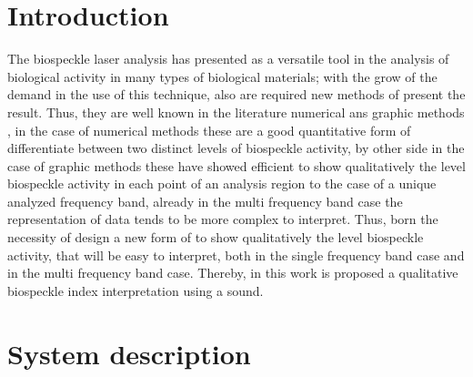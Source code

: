 \documentclass[review]{elsarticle}
\begin{document}
\section{Introduction}
The biospeckle laser analysis has presented as a versatile tool in the analysis of
biological activity in many types of biological materials; with the grow of the demand in 
the use of this technique, also are required new methods of present the result. Thus, they
are well known in the literature numerical ans graphic methods \cite{avd,Nothdurft:05},
in the case of numerical methods these are a good quantitative form of 
differentiate between two distinct levels of biospeckle activity, by other side in the case
of graphic methods these have showed efficient to show qualitatively the level biospeckle activity 
in each point of an analysis region to the case of a unique analyzed frequency band,
already in the multi frequency band case the representation of data 
tends to be more complex to interpret. 
Thus, born the necessity of design a new form of to show qualitatively the level biospeckle 
activity, that will be easy to interpret, both in the single frequency band case and in 
the multi frequency band case. Thereby, in this work is proposed a 
qualitative biospeckle index interpretation using a sound.

\section{System description}
\end{document}
